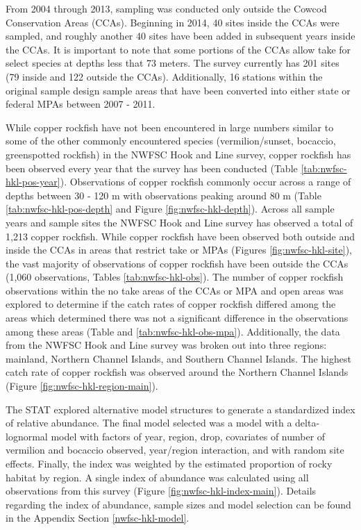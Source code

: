 \documentclass[11pt,
  english,
  letterpaper,
]{article}
\begin{document}
From 2004 through 2013, sampling was conducted only outside the Cowcod Conservation Areas (CCAs). Beginning in 2014, 40 sites inside the CCAs were sampled, and roughly another 40 sites have been added in subsequent years inside the CCAs. It is important to note that some portions of the CCAs allow take for select species at depths less that 73 meters. The survey currently has 201 sites (79 inside and 122 outside the CCAs). Additionally, 16 stations within the original sample design sample areas that have been converted into either state or federal MPAs between 2007 - 2011.

While copper rockfish have not been encountered in large numbers similar to some of the other commonly encountered species (vermilion/sunset, bocaccio, greenspotted rockfish) in the NWFSC Hook and Line survey, copper rockfish has been observed every year that the survey has been conducted (Table \ref{tab:nwfsc-hkl-pos-year}). Observations of copper rockfish commonly occur across a range of depths between 30 - 120 m with observations peaking around 80 m (Table \ref{tab:nwfsc-hkl-pos-depth} and Figure \ref{fig:nwfsc-hkl-depth}). Across all sample years and sample sites the NWFSC Hook and Line survey has observed a total of 1,213 copper rockfish. While copper rockfish have been observed both outside and inside the CCAs in areas that restrict take or MPAs (Figures \ref{fig:nwfsc-hkl-site}), the vast majority of observations of copper rockfish have been outside the CCAs (1,060 observations, Tables \ref{tab:nwfsc-hkl-obs}). The number of copper rockfish observations within the no take areas of the CCAs or MPA and open areas was explored to determine if the catch rates of copper rockfish differed among the areas which determined there was not a significant difference in the observations among these areas (Table and \ref{tab:nwfsc-hkl-obs-mpa}). Additionally, the data from the NWFSC Hook and Line survey was broken out into three regions: mainland, Northern Channel Islands, and Southern Channel Islands. The highest catch rate of copper rockfish was observed around the Northern Channel Islands (Figure \ref{fig:nwfsc-hkl-region-main}).

The STAT explored alternative model structures to generate a standardized index of relative abundance. The final model selected was a model with a delta-lognormal model with factors of year, region, drop, covariates of number of vermilion and bocaccio observed, year/region interaction, and with random site effects. Finally, the index was weighted by the estimated proportion of rocky habitat by region. A single index of abundance was calculated using all observations from this survey (Figure \ref{fig:nwfsc-hkl-index-main}). Details regarding the index of abundance, sample sizes and model selection can be found in the Appendix Section \ref{nwfsc-hkl-model}.
\end{document}
